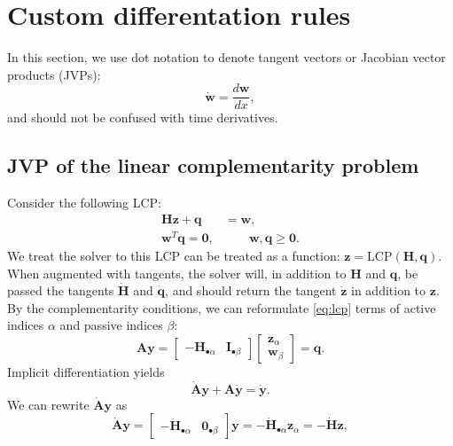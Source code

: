 \documentclass[preprint,12pt]{elsarticle}
\let\vec\bm
\let\mat\mathbf
\numberwithin{equation}{section}
\newcommand{\complementarityalign}[2]{{#1}^T{#2}=\vec{0}, &\qquad #1, #2 \geq \vec{0}}
\begin{document}
\section{Custom differentation rules}
\label{appendix:jvp_rules}
In this section, we use dot notation to denote tangent vectors or Jacobian vector products (JVPs):
\begin{equation}
    \dot{\vec{w}} = \frac{d \vec{w}}{d x},
\end{equation}
and should not be confused with time derivatives.
\subsection{JVP of the linear complementarity problem}
Consider the following LCP:
\begin{equation}
    \label{eq:lcp}
    \begin{aligned}
        \mat{H} \vec{z} + \vec{q} &= \vec{w}, \\
        \complementarityalign{\vec{w}}{\vec{q}}.
    \end{aligned}
\end{equation}
We treat the solver to this LCP can be treated as a function: $\vec{z} = \text{LCP}(\mat{H}, \mat{q})$.
When augmented with tangents, the solver will, in addition to $\mat{H}$ and $\vec{q}$, be passed the tangents $\dot{\mat{H}}$ and $\dot{\vec{q}}$, and should return the tangent $\dot{\vec{z}}$ in addition to $\vec{z}$.
By the complementarity conditions, we can reformulate \eqref{eq:lcp} terms of active indices $\alpha$ and passive indices $\beta$:
\begin{equation}
    \label{eq:lcp_in_complementary_basis}
    \mat{A} \vec{y} =
    \begin{bmatrix}
        -\mat{H}_{\bullet \alpha} & \mat{I}_{\bullet \beta}
    \end{bmatrix}
    \begin{bmatrix}
        \vec{z}_\alpha \\ \vec{w}_\beta
    \end{bmatrix}
    =
    \vec{q}.
\end{equation}
Implicit differentiation yields
\begin{equation}
    \dot{\mat{A}}\vec{y} + \mat{A}\dot{\vec{y}} = \dot{\vec{y}}.
\end{equation}
We can rewrite $\dot{\mat{A}} \vec{y}$ as
\begin{equation}
    \dot{\mat{A}}\vec{y} =     \begin{bmatrix}
        -\dot{\mat{H}}_{\bullet \alpha} & \mat{0}_{\bullet \beta}
    \end{bmatrix}\vec{y}=
    -\dot{\mat{H}}_{\bullet \alpha} \vec{z}_\alpha = -\dot{\mat{H}}  \vec{z},
\end{equation}
\end{document}

